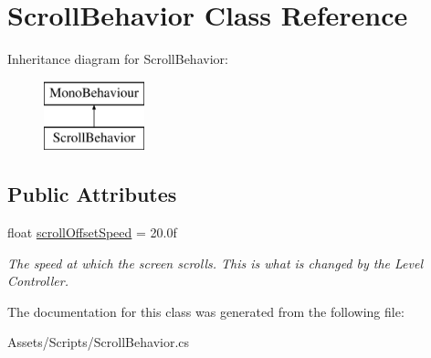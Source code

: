 \hypertarget{class_scroll_behavior}{}\section{Scroll\+Behavior Class Reference}
\label{class_scroll_behavior}
Inheritance diagram for Scroll\+Behavior\+:\begin{figure}[H]
\begin{center}
\leavevmode
\includegraphics[height=2.000000cm]{class_scroll_behavior}
\end{center}
\end{figure}
\subsection*{Public Attributes}
\begin{DoxyCompactItemize}
\item 
\mbox{\label{class_scroll_behavior_a0633f458f0e92a843c58eb301523a7b2}} 
float \mbox{\hyperlink{class_scroll_behavior_a0633f458f0e92a843c58eb301523a7b2}{scroll\+Offset\+Speed}} = 20.\+0f
\begin{DoxyCompactList}\small\item\em The speed at which the screen scrolls. This is what is changed by the Level Controller. \end{DoxyCompactList}\end{DoxyCompactItemize}


The documentation for this class was generated from the following file\+:\begin{DoxyCompactItemize}
\item 
Assets/\+Scripts/Scroll\+Behavior.\+cs\end{DoxyCompactItemize}
